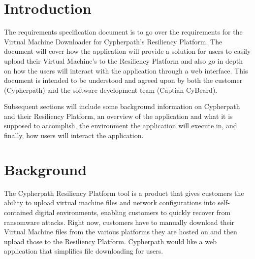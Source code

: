 \documentclass{article}
\begin{document}
    

    \tableofcontents
    \listoffigures

    \newpage
    \begin{versionhistory}
    \end{versionhistory}
    \newpage

    \section{Introduction}
    The requirements specification document is to go over the requirements for the Virtual Machine Downloader for Cypherpath's Resiliency Platform.
    The document will cover how the application will provide a solution for users to easily upload their Virtual Machine's to the Resiliency Platform and also
    go in depth on how the users will interact with the application through a web interface. This document is intended to be understood and agreed
    upon by both the customer (Cypherpath) and the software development team (Captian CyBeard).

    Subsequent sections will include some background information on Cypherpath and their Resiliency Platform, an overview of the application and what it
    is supposed to accomplish, the environment the application will execute in, and finally, how users will interact the application.


    \section{Background}
	The Cypherpath Resiliency Platform tool is a product that gives customers the ability to upload virtual machine files and network configurations into 
    self-contained digital environments, enabling customers to quickly recover from ransomware attacks. Right now, customers have to manually download their Virtual Machine files from
    the various platforms they are hosted on and then upload those to the Resiliency Platform. Cypherpath would like a web application that simplifies file downloading for users.
\end{document}
